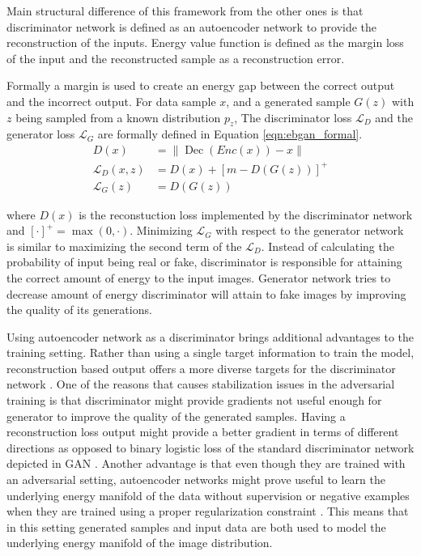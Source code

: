 Main structural difference of this framework from the other ones is that discriminator network is
defined as an autoencoder network to provide the reconstruction of the inputs. Energy value
function is defined as the margin loss of the input and the reconstructed sample
\cite{Zhao2016EnergybasedGA} as a reconstruction error. 

Formally a margin is used to create an energy gap between the correct output and the incorrect
output. For data sample $x$, and a generated sample $G(z)$ with $z$ being sampled from a known
distribution $p_z$, The discriminator loss $\mathcal{L}_{D}$ and the generator loss
$\mathcal{L}_{G}$ are formally defined in Equation \ref{eqn:ebgan_formal}.
\begin{equation}
\label{eqn:ebgan_formal}
\begin{aligned}D(x)&=\|\operatorname{Dec}(E n c(x))-x\|\\ \mathcal{L}_{D}(x, z) &=D(x)+[m-D(G(z))]^{+} \\ \mathcal{L}_{G}(z) &=D(G(z)) \end{aligned}
\end{equation}

where $D(x)$ is the reconstuction loss implemented by the discriminator network and  $[\cdot]^{+}=\max (0, \cdot)$. Minimizing
$\mathcal{L}_{G}$ with respect to the generator network is similar to maximizing the second term of the
$\mathcal{L}_{D}$. Instead of calculating the probability of input being real or fake,
discriminator is responsible for attaining the correct amount of energy to the input images. Generator network
tries to decrease amount of energy discriminator will attain to fake images by improving the quality of 
its generations.

Using autoencoder network as a discriminator brings additional advantages to the training setting.
Rather than using a single target information to train the model, reconstruction based output offers
a more diverse targets for the discriminator network \cite{Zhao2016EnergybasedGA}. One of the reasons that causes
stabilization issues in the adversarial training is that discriminator might provide gradients not
useful enough for generator to improve the quality of the generated samples. Having a reconstruction
loss output might provide a better gradient in terms of different directions \cite{Zhao2016EnergybasedGA} 
as opposed to binary logistic loss of the standard discriminator network depicted in 
GAN \cite{Goodfellow:2014:GAN:2969033.2969125}. Another advantage is that even though they are trained 
with an adversarial setting, autoencoder networks might prove useful to learn the underlying energy 
manifold of the data without supervision or negative examples when they are trained using a proper 
regularization constraint \cite{Zhao2016EnergybasedGA}. This means that in this setting generated 
samples and input data are both used to model the underlying energy manifold of the image distribution. 

